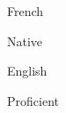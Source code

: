 

\begin{cventries}

\cventrytitleanddescription
    {French}
    {
    Native
    
    }
    
    
\cventrytitleanddescription
    {English}
    {
    Proficient
    
    }
    
\end{cventries}